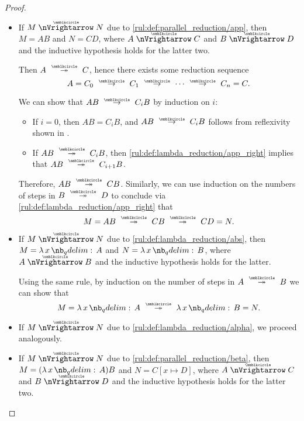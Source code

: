\begin{proof}
\begin{itemize}
    \item If \( M \ppred N \) due to \ref{rul:def:parallel_reduction/app}, then \( M = AB \) and \( N = CD \), where \( A \ppred C \) and \( B \ppred D \) and the inductive hypothesis holds for the latter two.

    Then \( A \pred* C \), hence there exists some reduction sequence
    \begin{equation*}
      A = C_0 \pred C_1 \pred \cdots \pred C_n = C.
    \end{equation*}

    We can show that \( AB \pred C_i B \) by induction on \( i \):
    \begin{itemize}
      \item If \( i = 0 \), then \( AB = C_i B \), and \( AB \pred C_i B \) follows from reflexivity shown in .

      \item If \( AB \pred* C_i B \), then \ref{rul:def:lambda_reduction/app_right} implies that \( AB \pred* C_{i+1} B \).
    \end{itemize}

    Therefore, \( AB \pred* CB \). Similarly, we can use induction on the numbers of steps in \( B \pred* D \) to conclude via \ref{rul:def:lambda_reduction/app_right} that
    \begin{equation*}
      M = AB \pred* CB \pred* CD = N.
    \end{equation*}

    \item If \( M \ppred N \) due to \ref{rul:def:lambda_reduction/abs}, then \( M = \qabs x A \) and \( N = \qabs x B \), where \( A \ppred B \) and the inductive hypothesis holds for the latter.

    Using the same rule, by induction on the number of steps in \( A \pred* B \) we can show that
    \begin{equation*}
      M = \qabs x A \pred* \qabs x B = N.
    \end{equation*}

    \item If \( M \ppred N \) due to \ref{rul:def:lambda_reduction/alpha}, we proceed analogously.

    \item If \( M \ppred N \) due to \ref{rul:def:parallel_reduction/beta}, then \( M = (\qabs x A)B \) and \( N = C[x \mapsto D] \), where \( A \ppred C \) and \( B \ppred D \) and the inductive hypothesis holds for the latter two.


\end{itemize}
\end{proof}

